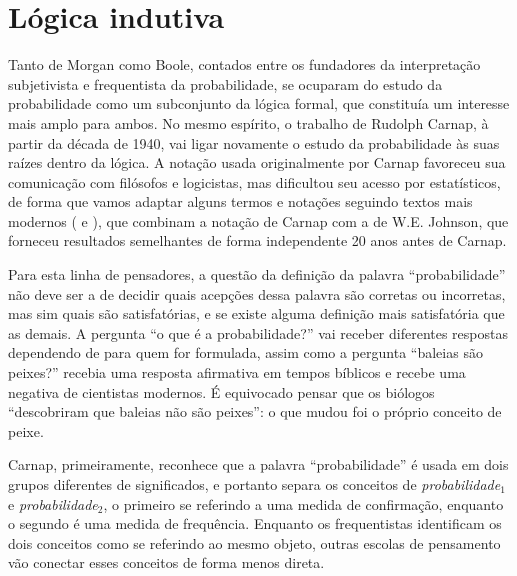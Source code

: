\section{Lógica indutiva}\label{sec:Carnap}

Tanto de Morgan como Boole, contados entre os fundadores da interpretação subjetivista e frequentista da probabilidade,
se ocuparam do estudo da probabilidade como um subconjunto da lógica formal, que constituía um interesse mais amplo para
ambos. No mesmo espírito, o trabalho de Rudolph Carnap, à partir da década de 1940, vai ligar novamente o estudo da probabilidade
às suas raízes dentro da lógica. A notação usada originalmente por Carnap favoreceu sua comunicação com filósofos e logicistas,
mas dificultou seu acesso por estatísticos, de forma que vamos adaptar alguns termos e notações seguindo textos mais
modernos (\citep{Zabell09} e \citep{Fitelson07}), que combinam a notação de Carnap com a de W.E. Johnson, que forneceu
resultados semelhantes de forma independente 20 anos antes de Carnap.

Para esta linha de pensadores, a questão da definição da palavra ``probabilidade'' não deve ser a de decidir quais acepções dessa palavra são
corretas ou incorretas, mas sim quais são satisfatórias, e se existe alguma definição mais satisfatória que as demais.
A pergunta ``o que é a probabilidade?''
vai receber diferentes respostas dependendo de para quem for formulada, assim como a pergunta ``baleias são peixes?''
recebia uma resposta afirmativa em tempos bíblicos e recebe uma negativa de cientistas modernos. É equivocado pensar que os
biólogos ``descobriram que baleias não são peixes'': o que mudou foi o próprio conceito de peixe. 

Carnap, primeiramente, reconhece que a palavra ``probabilidade'' é usada em
dois grupos diferentes de significados, e 
portanto separa os conceitos de {\em probabilidade$_1$} e {\em probabilidade$_2$}, o primeiro
se referindo a uma medida de confirmação, enquanto o segundo é uma medida de frequência.
Enquanto os frequentistas identificam os dois conceitos como se referindo ao mesmo objeto, outras escolas
de pensamento vão conectar esses conceitos de forma menos direta.

